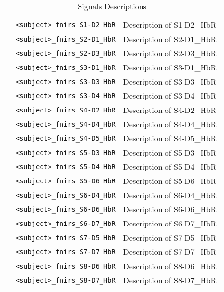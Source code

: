 \begin{table}
\begin{tabularx}{\textwidth}{|l|l|X|}
& \texttt{<subject>\_fnirs\_S1-D2\_HbR} & Description of S1-D2\_HbR \\
& \texttt{<subject>\_fnirs\_S2-D1\_HbR} & Description of S2-D1\_HbR \\
& \texttt{<subject>\_fnirs\_S2-D3\_HbR} & Description of S2-D3\_HbR \\
& \texttt{<subject>\_fnirs\_S3-D1\_HbR} & Description of S3-D1\_HbR \\
& \texttt{<subject>\_fnirs\_S3-D3\_HbR} & Description of S3-D3\_HbR \\
& \texttt{<subject>\_fnirs\_S3-D4\_HbR} & Description of S3-D4\_HbR \\
& \texttt{<subject>\_fnirs\_S4-D2\_HbR} & Description of S4-D2\_HbR \\
& \texttt{<subject>\_fnirs\_S4-D4\_HbR} & Description of S4-D4\_HbR \\
& \texttt{<subject>\_fnirs\_S4-D5\_HbR} & Description of S4-D5\_HbR \\
& \texttt{<subject>\_fnirs\_S5-D3\_HbR} & Description of S5-D3\_HbR \\
& \texttt{<subject>\_fnirs\_S5-D4\_HbR} & Description of S5-D4\_HbR \\
& \texttt{<subject>\_fnirs\_S5-D6\_HbR} & Description of S5-D6\_HbR \\
& \texttt{<subject>\_fnirs\_S6-D4\_HbR} & Description of S6-D4\_HbR \\
& \texttt{<subject>\_fnirs\_S6-D6\_HbR} & Description of S6-D6\_HbR \\
& \texttt{<subject>\_fnirs\_S6-D7\_HbR} & Description of S6-D7\_HbR \\
& \texttt{<subject>\_fnirs\_S7-D5\_HbR} & Description of S7-D5\_HbR \\
& \texttt{<subject>\_fnirs\_S7-D7\_HbR} & Description of S7-D7\_HbR \\
& \texttt{<subject>\_fnirs\_S8-D6\_HbR} & Description of S8-D6\_HbR \\
& \texttt{<subject>\_fnirs\_S8-D7\_HbR} & Description of S8-D7\_HbR \\
\hline
\end{tabularx}
\caption{Signals Descriptions}
\label{tab:fNIRS_signals}
\end{table}
